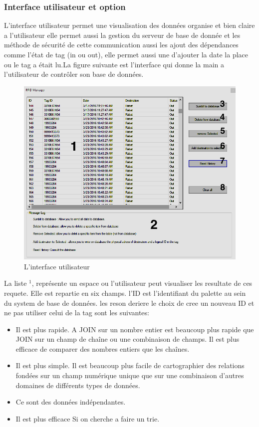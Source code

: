 \documentclass[11pt, a4paper, twoside]{book}
\begin{document}
\subsubsection{Interface utilisateur et option}
L'interface utilisateur permet  une visualisation des données organise et bien claire a l'utilisateur elle permet aussi  la gestion du serveur de base de donnée et les méthode de sécurité de cette communication aussi les ajout des dépendances comme l'état de tag (in ou out), elle permet aussi une d'ajouter la date la place ou le tag a était lu.La figure suivante est l'interface qui donne la main a l'utilisateur de contrôler son base de données.\\

\begin{figure}[H]
\centering
\includegraphics[width=\textwidth]{software}
\caption{L'interface utilisateur}
\end{figure}
La liste \(^{1}\), représente un espace ou l'utilisateur peut visualiser les resultate de ces requete. Elle est repartie en six champs. l'ID est l'identifiant du palette au sein du system de base de données. les reson deriere le choix de cree un nouveau ID et ne pas utiliser celui de la tag sont les suivantes:
\begin{itemize}
\item Il est plus rapide. A JOIN sur un nombre entier est beaucoup plus rapide que JOIN sur un champ de chaîne ou une combinaison de champs. Il est plus efficace de comparer des nombres entiers que les chaînes.

\item Il est plus simple. Il est beaucoup plus facile de cartographier des relations fondées sur un champ numérique unique que sur une combinaison d'autres domaines de différents types de données.

\item Ce sont des données indépendantes.

\item  Il est plus efficace Si on cherche a faire  un trie.\\
\end{itemize}
\end{document}
